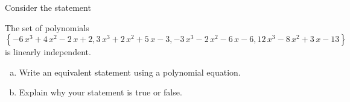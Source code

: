 
\begin{exerciseStatement}


Consider the statement 
\begin{center}\begin{minipage}{0.8\textwidth}
 The set of polynomials \( \left\{ -6 \, x^{3} + 4 \, x^{2} - 2 \, x + 2 , 3 \, x^{3} + 2 \, x^{2} + 5 \, x - 3 , -3 \, x^{3} - 2 \, x^{2} - 6 \, x - 6 , 12 \, x^{3} - 8 \, x^{2} + 3 \, x - 13 \right\} \) is linearly independent.
\end{minipage}\end{center}
    


\begin{enumerate}[(a)]
\item  Write an equivalent statement using a polynomial equation.
\item  Explain why your statement is true or false.
\end{enumerate}
    
\end{exerciseStatement}
    
